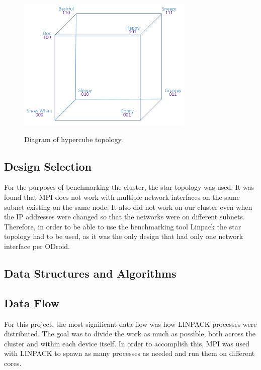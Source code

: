 \begin{figure}[tbh]
	\caption{Diagram of hypercube topology.}
	\centering
		\includegraphics[width=0.75\textwidth]{HyperCube2.png}
	\label{fig:hypercube}
\end{figure}


 \subsection{Design Selection}
	For the purposes of benchmarking the cluster, the star topology was used. It was found that MPI does not work with multiple network interfaces on the same subnet existing on the same node. It also did not work on our cluster even when the IP addresses were changed so that the networks were on different subnets. Therefore, in order to be able to use the benchmarking tool Linpack the star topology had to be used, as it was the only design that had only one network interface per ODroid.
 
 \subsection{Data Structures and Algorithms}
	

 \subsection{Data Flow}
	For this project, the most significant data flow was how LINPACK processes were distributed. The goal was to divide the work as much as possible, both across the cluster and within each device itself. In order to accomplish this, MPI was used with LINPACK to spawn as many processes as needed and run them on different cores. 
 

